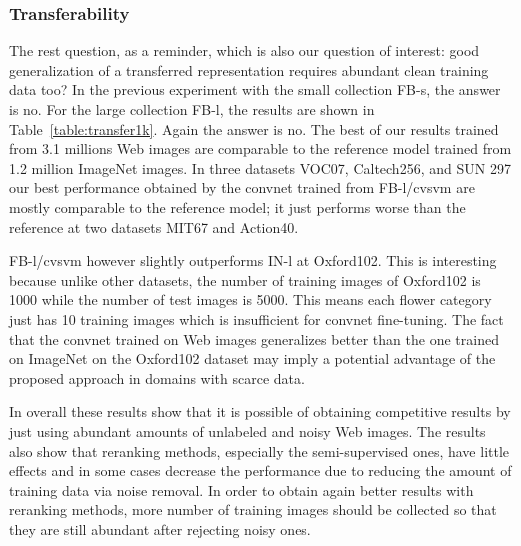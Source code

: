 \documentclass[preprint,12pt]{elsarticle}
\begin{document}
\subsubsection{Transferability}\label{sec:transfer1k}
\noindent The rest question, as a reminder, which is also our question of interest: good generalization of a transferred representation requires abundant clean training data too? In the previous experiment with the small collection FB-s, the answer is no. For the large collection FB-l, the results are shown in Table~\ref{table:transfer1k}. Again the answer is no. The best of our results trained from 3.1 millions Web images are comparable to the reference model trained from 1.2 million ImageNet images. In three datasets VOC07, Caltech256, and SUN 297 our best performance obtained by the convnet trained from FB-l/cvsvm are mostly comparable to the reference model; it just performs worse than the reference at two datasets MIT67 and Action40.  

FB-l/cvsvm however slightly outperforms IN-l at Oxford102. This is interesting because unlike other datasets, the number of training images of Oxford102 is 1000 while the number of test images is 5000. This means each flower category just has 10 training images which is insufficient for convnet fine-tuning. The fact that the convnet trained on Web images generalizes better than the one trained on ImageNet on the Oxford102 dataset may imply a potential advantage of the proposed approach in domains with scarce data. 

In overall these results show that it is possible of obtaining competitive results by just using abundant amounts of unlabeled and noisy Web images. The results also show that reranking methods, especially the semi-supervised ones, have little effects and in some cases decrease the performance due to reducing the amount of training data via noise removal. In order to obtain again better results with reranking methods, more number of training images should be collected so that they are still abundant after rejecting noisy ones.
\end{document}
